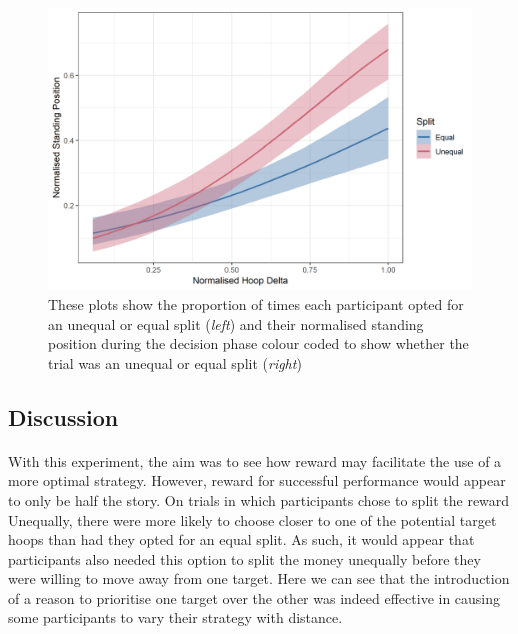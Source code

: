 \documentclass[12pt]{article}
\begin{document}
\begin{figure}[ht!]%
	\includegraphics[scale=0.9]{Figures/Experiment_5_Unequal_Reward/Model_output}
	\centering
	\captionsetup{justification=centering}
	\caption{These plots show the proportion of times each participant opted for an unequal or equal split (\textit{left}) and their normalised standing position during the decision phase colour coded to show whether the trial was an unequal or equal split (\textit{right})}
	\label{fig:Model_output_Reward}
\end{figure}


\subsection*{Discussion}

\paragraph{} With this experiment, the aim was to see how reward may facilitate the use of a more optimal strategy. However, reward for successful performance would appear to only be half the story. On trials in which participants chose to split the reward Unequally, there were more likely to choose closer to one of the potential target hoops than had they opted for an equal split. As such, it would appear that participants also needed this option to split the money unequally before they were willing to move away from one target. Here we can see that the introduction of a reason to prioritise one target over the other was indeed effective in causing some participants to vary their strategy with distance. 
\end{document}
